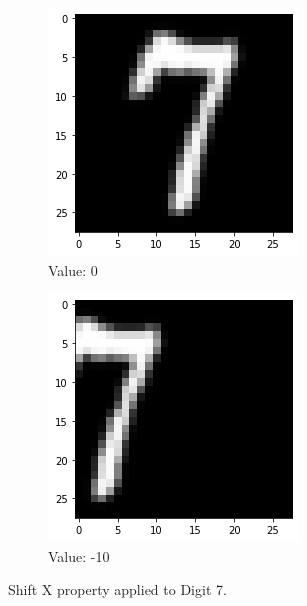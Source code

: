 \begin{figure}[htb!]
\begin{subfigure}[b]{.3\textwidth}
            \includegraphics[width=\textwidth]{images/shiftx2.png}
            \caption{Value: 0}
            \label{fig:Rotate-misclass0}
        \end{subfigure}%
        \begin{subfigure}[b]{.3\textwidth}
            \centering
            \includegraphics[width=\linewidth]{images/shiftx3.png}
            \caption{Value: -10}
            \label{fig:Rotate-misclass0}
        \end{subfigure}
        
        \caption{Shift X property applied to Digit 7.}
        \label{fig:Rotate-misclassifications}
    \end{figure}
    \FloatBarrier
    
